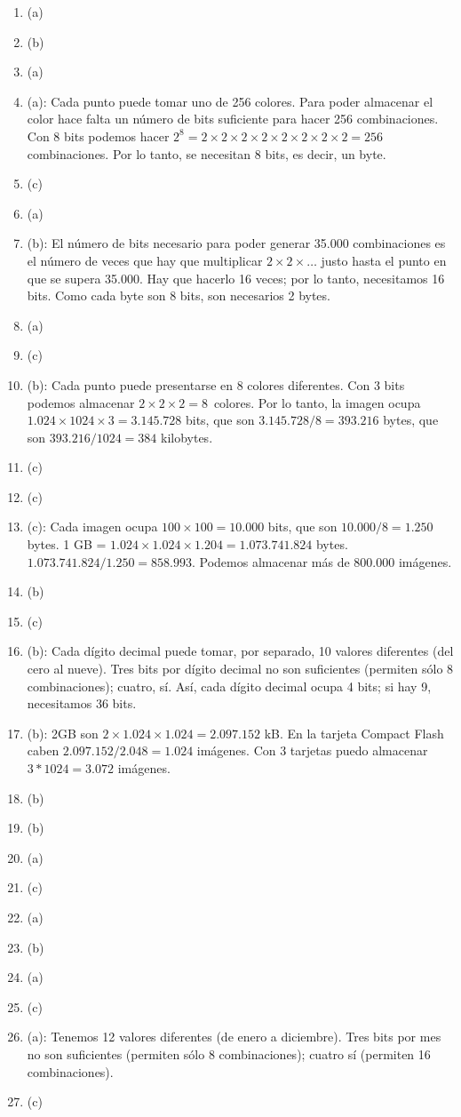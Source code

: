 \begin{enumerate}
\item (a) \item (b) \item (a) \item (a): Cada punto puede tomar uno de 256 colores. Para poder almacenar el color hace falta un número de bits suficiente para hacer 256 combinaciones. Con 8 bits podemos hacer \(2^8=2\times2\times 2\times 2\times 2\times 2\times 2\times 2=256\) combinaciones. Por lo tanto, se necesitan 8 bits, es decir, un byte. \item (c) 

\item (a) \item (b): El número de bits necesario para poder generar 35.000 combinaciones es el número de veces que hay que multiplicar \(2\times 2\times\ldots\) justo hasta el punto en que se supera 35.000. Hay que hacerlo 16 veces; por lo tanto, necesitamos 16 bits. Como cada byte son 8 bits, son necesarios 2 bytes. \item (a) \item (c) \item (b): Cada punto puede presentarse en 8 colores diferentes. Con 3 bits podemos almacenar \(2\times2\times2=8\)~colores. Por lo tanto, la imagen ocupa $1.024 \times 1024 \times 3 = 3.145.728$ bits, que son $3.145.728/8=393.216$ bytes, que son $393.216/1024=384$ kilobytes. 

\item (c) \item (c) \item (c): Cada imagen ocupa $100\times100 = 10.000$ bits, que son $10.000 / 8 = 1.250$ bytes. 1 GB = $1.024 \times 1.024 \times 1.204 = 1.073.741.824 $ bytes. $ 1.073.741.824 / 1.250 = 858.993$. Podemos almacenar más de 800.000 imágenes. \item (b) \item (c) 

\item (b): Cada dígito decimal puede tomar, por separado, 10 valores diferentes (del cero al nueve). Tres bits por dígito decimal no son suficientes (permiten sólo 8 combinaciones); cuatro, sí. Así, cada dígito decimal ocupa 4 bits; si hay 9, necesitamos 36 bits. \item (b): 2GB son $ 2\times 1.024 \times 1.024 = 2.097.152$ kB. En la tarjeta Compact Flash caben $ 2.097.152 / 2.048 = 1.024$ imágenes. Con 3 tarjetas puedo almacenar $ 3 * 1024 = 3.072$ imágenes. \item (b) \item (b) \item (a) 

\item (c) \item (a) \item (b) \item (a) \item (c) 

\item (a): Tenemos 12 valores diferentes (de enero a diciembre). Tres bits por mes no son suficientes (permiten sólo 8 combinaciones); cuatro sí (permiten 16 combinaciones). \item (c) \end{enumerate} 